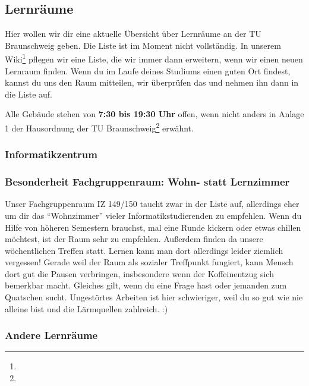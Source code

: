 
\subsection{Lernräume}


Hier wollen wir dir eine aktuelle Übersicht über Lernräume an der TU Braunschweig geben. 
Die Liste ist im Moment nicht vollständig. 
In unserem Wiki\footnote{} pflegen wir eine Liste, die wir immer dann erweitern, wenn wir einen neuen Lernraum finden. 
Wenn du im Laufe deines Studiums einen guten Ort findest, kannst du uns den Raum mitteilen, wir überprüfen das und nehmen ihn dann in die Liste auf.

Alle Gebäude stehen von \textbf{7:30 bis 19:30 Uhr} offen, wenn nicht anders in Anlage 1 der Hausordnung der TU Braunschweig\footnote{} erwähnt.

\subsubsection*{Informatikzentrum}



\subsubsection*{Besonderheit Fachgruppenraum: Wohn- statt Lernzimmer}
Unser Fachgruppenraum IZ 149/150 taucht zwar in der Liste auf, allerdings eher um dir das \enquote{Wohnzimmer} vieler Informatikstudierenden  zu empfehlen. Wenn du  Hilfe von höheren Semestern brauchst, mal eine Runde kickern oder etwas chillen möchtest, ist der Raum sehr zu empfehlen. Außerdem finden da unsere wöchentlichen Treffen statt. Lernen kann man dort allerdings leider ziemlich vergessen! Gerade weil der Raum als sozialer Treffpunkt fungiert, kann Mensch dort gut die Pausen verbringen, insbesondere wenn der Koffeinentzug sich bemerkbar macht. Gleiches gilt, wenn du eine Frage hast oder jemanden zum Quatschen sucht. Ungestörtes Arbeiten ist hier schwieriger, weil du so gut wie nie alleine bist und die Lärmquellen zahlreich. :)

\subsubsection*{Andere Lernräume}


